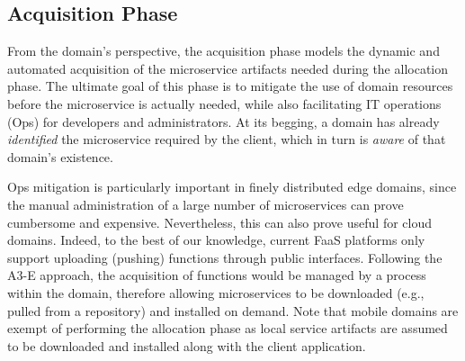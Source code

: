 


\subsection*{Acquisition Phase}\label{sec:A3-E-acquisition}


From the domain's perspective, the acquisition phase models the dynamic and automated acquisition of the microservice artifacts needed during the allocation phase. 
The ultimate goal of this phase is to mitigate the use of domain resources before the microservice is actually needed, while also facilitating IT operations (Ops) for developers and administrators. At its begging, a domain has already \textit{identified} the microservice required by the client, which in turn is \textit{aware} of that domain's existence.

Ops mitigation is particularly important in finely distributed edge domains, since the manual administration of a large number of microservices can prove cumbersome and expensive. Nevertheless, this can also prove useful for cloud domains. Indeed, to the best of our knowledge, current FaaS platforms only support uploading (pushing) functions through public interfaces. Following the A3-E approach, the acquisition of functions would be managed by a process within the domain, therefore allowing microservices to be downloaded (e.g., pulled from a repository) and installed on demand. Note that mobile domains are exempt of performing the allocation phase as local service artifacts are assumed to be downloaded and installed along with the client application.

